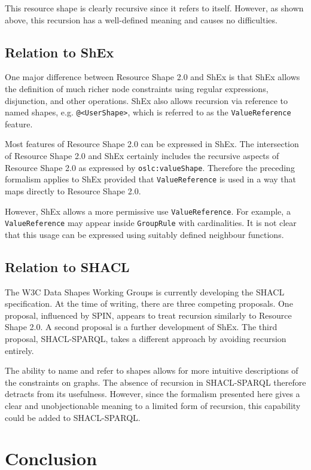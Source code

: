 \documentclass{article}
\begin{document}
This resource shape is clearly recursive since it refers to itself.
However, as shown above, this recursion has a well-defined meaning and causes no difficulties.

\subsection{Relation to ShEx}

One major difference between Resource Shape 2.0 and ShEx is that ShEx allows the definition of
much richer node constraints using regular expressions, disjunction, and other operations.
ShEx also allows recursion via reference to named shapes, e.g. {\tt @<UserShape>},
which is referred to as the {\tt ValueReference} feature.

Most features of Resource Shape 2.0 can be expressed in ShEx. The intersection
of Resource Shape 2.0 and ShEx certainly includes the recursive aspects of Resource Shape 2.0 as
expressed by {\tt oslc:valueShape}.
Therefore the preceding formalism applies to ShEx provided that {\tt ValueReference} is used in a way that
maps directly to Resource Shape 2.0.

However, ShEx allows a more permissive use {\tt ValueReference}. 
For example, a {\tt ValueReference} may appear inside {\tt GroupRule} with cardinalities.
It is not clear that this usage can be expressed using suitably defined neighbour functions.

\subsection{Relation to SHACL}

The W3C Data Shapes Working Groups is currently developing the SHACL specification.
At the time of writing, there are three competing proposals.
One proposal, influenced by SPIN, appears to treat recursion similarly to Resource Shape 2.0.
A second proposal is a further development of ShEx.
The third proposal, SHACL-SPARQL, takes a different approach by avoiding recursion entirely.

The ability to name and refer to shapes allows for more intuitive descriptions of the constraints on graphs.
The absence of recursion in SHACL-SPARQL therefore detracts from its usefulness.
However, since the formalism presented here gives a clear and unobjectionable meaning to a
limited form of recursion, this capability could be added to SHACL-SPARQL.

\section{Conclusion}
\label{sec-conclusion}
\end{document}
